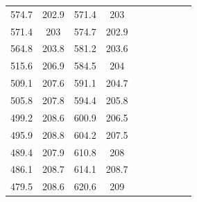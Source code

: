 \begin{center}
\begin{tabular}{|cccc||cccc||cc|}
    574.7    & 202.9                   & 571.4 & 203                          &       &                           &       &                              &          &                                    \\
    571.4    & 203                     & 574.7 & 202.9                        &       &                           &       &                              &          &                                    \\
    564.8    & 203.8                   & 581.2 & 203.6                        &       &                           &       &                              &          &                                    \\
    515.6    & 206.9                   & 584.5 & 204                          &       &                           &       &                              &          &                                    \\
    509.1    & 207.6                   & 591.1 & 204.7                        &       &                           &       &                              &          & \multicolumn{1}{l|}{}              \\
    505.8    & 207.8                   & 594.4 & 205.8                        &       &                           &       &                              &          &                                    \\
    499.2    & 208.6                   & 600.9 & 206.5                        &       &                           &       &                              &          &                                    \\
    495.9    & 208.8                   & 604.2 & 207.5                        &       &                           &       &                              &          &                                    \\
    489.4    & 207.9                   & 610.8 & 208                          &       &                           &       &                              &          &                                    \\
    486.1    & 208.7                   & 614.1 & 208.7                        &       &                           &       &                              &          &                                    \\
    479.5    & 208.6                   & 620.6 & 209                          &       &                           &       &                              &          &                                    \\

\end{tabular}
\end{center}
